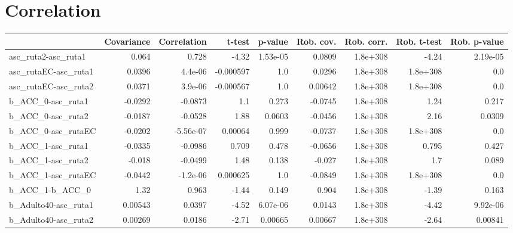 \section{Correlation}
\begin{tabular}{lrrrrrrrr}
\toprule
{} &  Covariance &  Correlation &    t-test &  p-value &  Rob. cov. &  Rob. corr. &  Rob. t-test &  Rob. p-value \\
\midrule
asc\_ruta2-asc\_ruta1          &       0.064 &        0.728 &     -4.32 & 1.53e-05 &     0.0809 &    1.8e+308 &        -4.24 &      2.19e-05 \\
asc\_rutaEC-asc\_ruta1         &      0.0396 &      4.4e-06 & -0.000597 &      1.0 &     0.0296 &    1.8e+308 &     1.8e+308 &           0.0 \\
asc\_rutaEC-asc\_ruta2         &      0.0371 &      3.9e-06 & -0.000567 &      1.0 &    0.00642 &    1.8e+308 &     1.8e+308 &           0.0 \\
b\_ACC\_0-asc\_ruta1            &     -0.0292 &      -0.0873 &       1.1 &    0.273 &    -0.0745 &    1.8e+308 &         1.24 &         0.217 \\
b\_ACC\_0-asc\_ruta2            &     -0.0187 &      -0.0528 &      1.88 &   0.0603 &    -0.0456 &    1.8e+308 &         2.16 &        0.0309 \\
b\_ACC\_0-asc\_rutaEC           &     -0.0202 &    -5.56e-07 &   0.00064 &    0.999 &    -0.0737 &    1.8e+308 &     1.8e+308 &           0.0 \\
b\_ACC\_1-asc\_ruta1            &     -0.0335 &      -0.0986 &     0.709 &    0.478 &    -0.0656 &    1.8e+308 &        0.795 &         0.427 \\
b\_ACC\_1-asc\_ruta2            &      -0.018 &      -0.0499 &      1.48 &    0.138 &     -0.027 &    1.8e+308 &          1.7 &         0.089 \\
b\_ACC\_1-asc\_rutaEC           &     -0.0442 &     -1.2e-06 &  0.000625 &      1.0 &    -0.0849 &    1.8e+308 &     1.8e+308 &           0.0 \\
b\_ACC\_1-b\_ACC\_0              &        1.32 &        0.963 &     -1.44 &    0.149 &      0.904 &    1.8e+308 &        -1.39 &         0.163 \\
b\_Adulto40-asc\_ruta1         &     0.00543 &       0.0397 &     -4.52 & 6.07e-06 &     0.0143 &    1.8e+308 &        -4.42 &      9.92e-06 \\
b\_Adulto40-asc\_ruta2         &     0.00269 &       0.0186 &     -2.71 &  0.00665 &    0.00667 &    1.8e+308 &        -2.64 &       0.00841 \\

\end{tabular}
